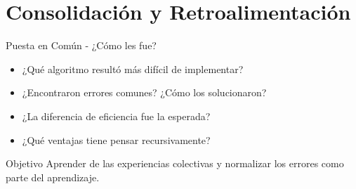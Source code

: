 \documentclass[10pt]{beamer}
\begin{document}
\section{Consolidación y Retroalimentación}

\begin{frame}{Puesta en Común - ¿Cómo les fue?}
  \begin{itemize}
    \item ¿Qué algoritmo resultó más difícil de implementar?
    \item ¿Encontraron errores comunes? ¿Cómo los solucionaron?
    \item ¿La diferencia de eficiencia fue la esperada?
    \item ¿Qué ventajas tiene pensar recursivamente?
  \end{itemize}
  
  \begin{alertblock}{Objetivo}
    Aprender de las experiencias colectivas y normalizar los errores como 
    parte del aprendizaje.
  \end{alertblock}
\end{frame}
\end{document}
